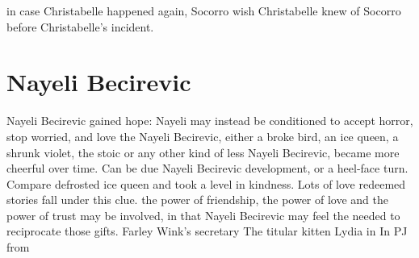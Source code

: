 \documentclass[12pt]{book}
\begin{document}
in case Christabelle happened again, Socorro wish Christabelle knew of Socorro before Christabelle's incident.



\chapter{Nayeli Becirevic}

Nayeli Becirevic gained hope: Nayeli may instead be conditioned to accept horror, stop worried, and love the Nayeli Becirevic, either a broke bird, an ice queen, a shrunk violet, the stoic or any other kind of less Nayeli Becirevic, became more cheerful over time. Can be due Nayeli Becirevic development, or a heel-face turn. Compare defrosted ice queen and took a level in kindness. Lots of love redeemed stories fall under this clue. the power of friendship, the power of love and the power of trust may be involved, in that Nayeli Becirevic may feel the needed to reciprocate those gifts. Farley Wink's secretary The titular kitten Lydia in In PJ from
\end{document}
